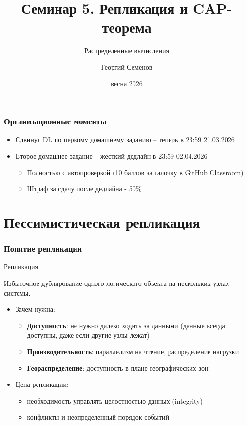 \documentclass{beamer}
\title{Семинар 5. Репликация и CAP-теорема}
\subtitle{Распределенные вычисления}
\author{Георгий Семенов}
\institute{Институт прикладных компьютерных наук \\ Университет ИТМО}
\date{весна 2026}
\newenvironment{definitionbox}[1][Определение]{%
  \begin{exampleblock}{#1}
}{%
  \end{exampleblock}
}
\begin{document}
\frame{\titlepage}

\begin{frame}
\frametitle{Организационные моменты}

\begin{itemize}
  \item Сдвинут DL по первому домашнему заданию – теперь в 23:59 21.03.2026
  \item Второе домашнее задание – жесткий дедлайн в 23:59 02.04.2026
  \begin{itemize}
    \item Полностью с автопроверкой (10 баллов за галочку в GitHub Classroom)
    \item Штраф за сдачу после дедлайна - 50\%
  \end{itemize}
\end{itemize}

\end{frame}

\section{Пессимистическая репликация}

\begin{frame}
\frametitle{Понятие репликации}

\begin{definitionbox}[Репликация]
Избыточное дублирование одного логического объекта на нескольких узлах системы.
\end{definitionbox}

\begin{itemize}
  \item Зачем нужна:
  \begin{itemize}
    \item \textbf{Доступность}: не нужно далеко ходить за данными (данные всегда доступны, даже если другие узлы лежат)
    \item \textbf{Производительность}: параллелизм на чтение, распределение нагрузки
    \item \textbf{Геораспределение}: доступность в плане географических зон
  \end{itemize}
  \item Цена репликации:
  \begin{itemize}
    \item необходимость управлять целостностью данных (integrity)
    \item конфликты и неопределенный порядок событий
  \end{itemize}
\end{itemize}

\end{frame}
\end{document}
